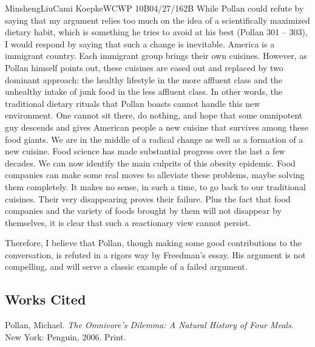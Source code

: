 \documentclass[12pt,letterpaper]{article}
\begin{document}
\begin{mla}{Minsheng}{Liu}{Cami Koepke}{WCWP 10B}{04/27/16}{2B}
While Pollan could refute by saying that my argument relies too much on
the idea of a scientifically maximized dietary habit, which is something
he tries to avoid at his best (Pollan 301 -- 303), I would respond by
saying that such a change is inevitable. America is a immigrant country.
Each immigrant group brings their own cuisines. However, as Pollan
himself points out, these cuisines are eased out and replaced by two
dominant approach: the healthy lifestyle in the more affluent class and
the unhealthy intake of junk food in the less affluent class. In other
words, the traditional dietary rituals that Pollan boasts cannot handle
this new environment. One cannot sit there, do nothing, and hope that
some omnipotent guy descends and gives American people a new cuisine
that survives among these food giants. We are in the middle of a radical
change as well as a formation of a new cuisine. Food science has made
substantial progress over the last a few decades. We can now identify
the main culprits of this obesity epidemic. Food companies can make some
real moves to alleviate these problems, maybe solving them completely.
It makes no sense, in such a time, to go back to our traditional
cuisines. Their very disappearing proves their failure. Plus the fact
that food companies and the variety of foods brought by them will not
disappear by themselves, it is clear that such a reactionary view cannot
persist.

Therefore, I believe that Pollan, though making some good contributions
to the conversation, is refuted in a rigors way by Freedman's essay. His
argument is not compelling, and will serve a classic example of a failed
argument.


\subsection*{Works Cited}
\bibent Pollan, Michael. \textit{The Omnivore's Dilemma: A Natural History of Four Meals}. New York: Penguin, 2006. Print.

\end{mla}
\end{document}
